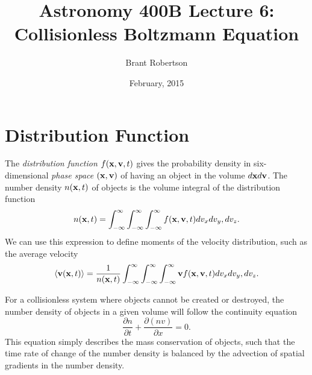 \documentclass[]{article}
\title{Astronomy 400B Lecture 6: Collisionless Boltzmann Equation}
\author{Brant Robertson}
\date{February, 2015}
\begin{document}
\maketitle

\section{Distribution Function}

The {\it distribution function} $f(\mathbf{x},\mathbf{v},t)$ gives the probability density
in six-dimensional {\it phase space} $(\mathbf{x},\mathbf{v})$ of having an object
in the volume $d\mathbf{x} d\mathbf{v}$.  The number density $n(\mathbf{x},t)$ of objects is the
volume integral of the distribution function
\begin{equation}
n(\mathbf{x},t) = \int_{-\infty}^{\infty}\int_{-\infty}^{\infty}\int_{-\infty}^{\infty} f(\mathbf{x},\mathbf{v},t) dv_{x}dv_y,dv_z.
\end{equation}
\noindent
We can use this expression to define moments of the velocity distribution, such as
the average velocity 
\begin{equation}
\langle\mathbf{v}(\mathbf{x},t)\rangle = \frac{1}{n(\mathbf{x},t)} \int_{-\infty}^{\infty}\int_{-\infty}^{\infty}\int_{-\infty}^{\infty} \mathbf{v} f(\mathbf{x},\mathbf{v},t) dv_{x}dv_y,dv_z.
\end{equation}

For a collisionless system where objects cannot be created or destroyed, the number density of objects
in a given volume will follow the continuity equation
\begin{equation}
\label{eqn:continuity}
\frac{\partial n}{\partial t} + \frac{\partial (nv)}{\partial x} = 0.
\end{equation}
\noindent
This equation simply describes the mass conservation of objects, such that
the time rate of change of the number density is balanced by the advection of
spatial gradients in the number density.
\end{document}
